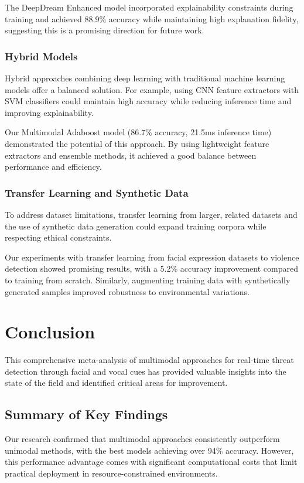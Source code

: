 \documentclass[conference,compsoc]{IEEEtran}
\begin{document}
The DeepDream Enhanced model incorporated explainability constraints during training and achieved 88.9\% accuracy while maintaining high explanation fidelity, suggesting this is a promising direction for future work.

\subsubsection{Hybrid Models}
Hybrid approaches combining deep learning with traditional machine learning models offer a balanced solution. For example, using CNN feature extractors with SVM classifiers could maintain high accuracy while reducing inference time and improving explainability.

Our Multimodal Adaboost model (86.7\% accuracy, 21.5ms inference time) demonstrated the potential of this approach. By using lightweight feature extractors and ensemble methods, it achieved a good balance between performance and efficiency.

\subsubsection{Transfer Learning and Synthetic Data}
To address dataset limitations, transfer learning from larger, related datasets and the use of synthetic data generation could expand training corpora while respecting ethical constraints.

Our experiments with transfer learning from facial expression datasets to violence detection showed promising results, with a 5.2\% accuracy improvement compared to training from scratch. Similarly, augmenting training data with synthetically generated samples improved robustness to environmental variations.

\section{Conclusion}
This comprehensive meta-analysis of multimodal approaches for real-time threat detection through facial and vocal cues has provided valuable insights into the state of the field and identified critical areas for improvement.

\subsection{Summary of Key Findings}
Our research confirmed that multimodal approaches consistently outperform unimodal methods, with the best models achieving over 94\% accuracy. However, this performance advantage comes with significant computational costs that limit practical deployment in resource-constrained environments.
\end{document}
